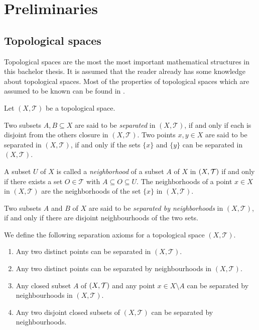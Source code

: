 \chapter{Preliminaries}

\section{Topological spaces}

Topological spaces are the most the most important mathematical structures in this bachelor thesis. It is assumed that the reader already has some knowledge about topological spaces. Most of the properties of topological spaces which are assumed to be known can be found in \cite{Ana1&2}.

\begin{definition}
	Let $(X, \mathcal{T})$ be a topological space. 
	
	Two subsets $A,B \subseteq X$ are said to be \textit{separated} in $(X, \mathcal{T})$, if and only if each is disjoint from the others closure in $(X, \mathcal{T})$. Two points $x,y \in X$ are said to be separated in $(X, \mathcal{T})$, if and only if the sets $\{x\}$ and $\{y\}$ can be separated in $(X, \mathcal{T})$.
	
	A subset $U$ of $X$ is called a \textit{neighborhood} of a subset $A$ of $X$ in $\tspace$ if and only if there exists a set $O \in \mathcal{T}$ with $A \subseteq O \subseteq U$. The neighborhoods of a point $x \in X$ in $(X, \mathcal{T})$ are the neighborhoods of the set $\{x\}$ in $(X, \mathcal{T})$.
	
	Two subsets $A$ and $B$ of $X$ are said to be \textit{separated by neighborhoods} in $(X, \mathcal{T})$, if and only if there are disjoint neighbourhoods of the two sets. 
\end{definition}

\begin{definition}
	We define the following separation axioms for a topological space $(X, \mathcal{T})$.
	\begin{enumerate}[label= $(T_\arabic*)$]
		\item \label{axiom:t1} Any two distinct points can be separated in $(X, \mathcal{T})$. 
		
		\item \label{axiom:t2} Any two distinct points can be separated by neighbourhoods in $(X, \mathcal{T})$. 
		
		\item \label{axiom:t3} Any closed subset $A$ of $\tspace$ and any point $x \in X\setminus A$ can be separated by neighbourhoods in $(X, \mathcal{T})$. 
		
		\item \label{axiom:t4} Any two disjoint closed subsets of $(X, \mathcal{T})$ can be separated by neighbourhoods. 
	\end{enumerate}
\end{definition}


